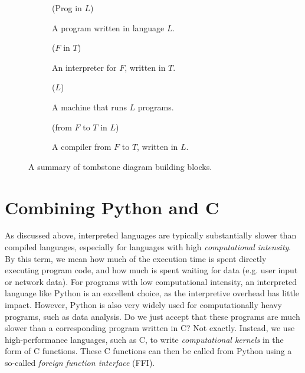 \begin{figure}[b]
  \centering

  \begin{subfigure}[b]{0.45\textwidth}
    \centering
    \tprog(Prog in $L$)
    \caption{A program written in language
      $L$.}
    \label{fig:tprog}
  \end{subfigure}
  \hfill
  \begin{subfigure}[b]{0.45\textwidth}
    \centering
    \tinter($F$ in $T$)
    \caption{An interpreter for $F$, written in $T$.}
    \label{fig:tinter}
  \end{subfigure}

  \bigskip

  \begin{subfigure}[b]{0.45\textwidth}
    \centering
    \tmachine($L$)
    \caption{A machine that runs $L$ programs.}
    \label{fig:tmachine}
  \end{subfigure}
  \hfill
  \begin{subfigure}[b]{0.45\textwidth}
    \centering
    \tcompiler(from $F$ to $T$ in $L$)
    \caption{A compiler from $F$ to $T$, written in $L$.}
    \label{fig:tcompiler}
  \end{subfigure}

  \caption{A summary of tombstone diagram building blocks.}
  \label{fig:tombstone}
\end{figure}

\section{Combining Python and C}
\label{sec:python-calling-c}

As discussed above, interpreted languages are typically substantially
slower than compiled languages, especially for languages with high
\textit{computational intensity}.  By this term, we mean how much of
the execution time is spent directly executing program code, and how
much is spent waiting for data (e.g. user input or network data).  For
programs with low computational intensity, an interpreted language
like Python is an excellent choice, as the interpretive overhead has
little impact.  However, Python is also very widely used for
computationally heavy programs, such as data analysis.  Do we just
accept that these programs are much slower than a corresponding
program written in C?  Not exactly.  Instead, we use high-performance
languages, such as C, to write \textit{computational kernels} in the
form of C functions.  These C functions can then be called from Python
using a so-called \textit{foreign function interface} (FFI).

